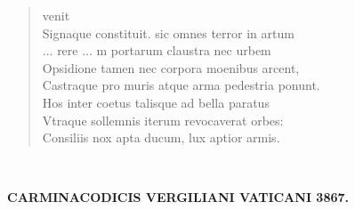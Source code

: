 \documentclass[11pt, a4paper]{report}
\begin{document}
\begin{verse}
                    venit \\ Signaque constituit. sic omnes terror in artum \\ 
                     \lbrack ... \rbrack  rere  \lbrack ... \rbrack  m portarum claustra nec urbem \\ Opsidione tamen nec corpora moenibus arcent, \\ Castraque pro muris atque arma pedestria ponunt. \\ Hos inter coetus talisque ad bella paratus \\ Vtraque sollemnis iterum revocaverat orbes: \\ Consiliis nox apta ducum, lux aptior armis. \\ 
      \end{verse}
  
            
        ﻿\pagebreak 
    
            \begin{center} \textbf{CARMINACODICIS VERGILIANI VATICANI 3867.} \end{center}
\end{document}
